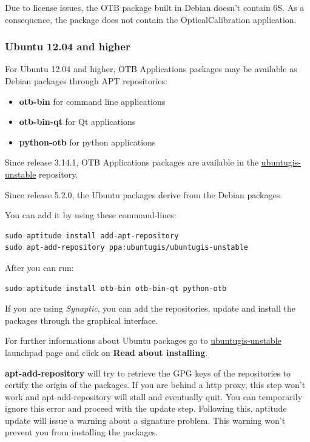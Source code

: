 Due to license issues, the OTB package built in Debian doesn't contain 6S. As
a consequence, the package does not contain the OpticalCalibration application.

\subsubsection{Ubuntu 12.04 and higher}

For Ubuntu 12.04 and higher, OTB Applications packages may be available as
Debian packages through APT repositories:
\begin{itemize}
\item \textbf{otb-bin} for command line applications
\item \textbf{otb-bin-qt} for Qt applications
\item \textbf{python-otb} for python applications
\end{itemize}

Since release 3.14.1, OTB Applications packages are available in the
\href{https://launchpad.net/~ubuntugis/+archive/ubuntugis-unstable}{ubuntugis-unstable} repository.

Since release 5.2.0, the Ubuntu packages derive from the Debian packages.

You can add it by using these command-lines:
\begin{verbatim}
sudo aptitude install add-apt-repository
sudo apt-add-repository ppa:ubuntugis/ubuntugis-unstable
\end{verbatim}

After you can run:
\begin{verbatim}
sudo aptitude install otb-bin otb-bin-qt python-otb
\end{verbatim}

If you are using \emph{Synaptic}, you can add the repositories, update and install the packages through the
graphical interface.

For further informations about Ubuntu packages go to
\href{https://launchpad.net/~ubuntugis/+archive/ubuntugis-unstable}{ubuntugis-unstable}
launchpad page and click on \textbf{Read about installing}.

\textbf{apt-add-repository} will try to retrieve the GPG keys of the
repositories to certify the origin of the packages. If you are behind a http
proxy, this step won't work and apt-add-repository will stall and eventually
quit. You can temporarily ignore this error and proceed with the update
step. Following this, aptitude update will issue a warning about a signature
problem. This warning won't prevent you from installing the packages.

